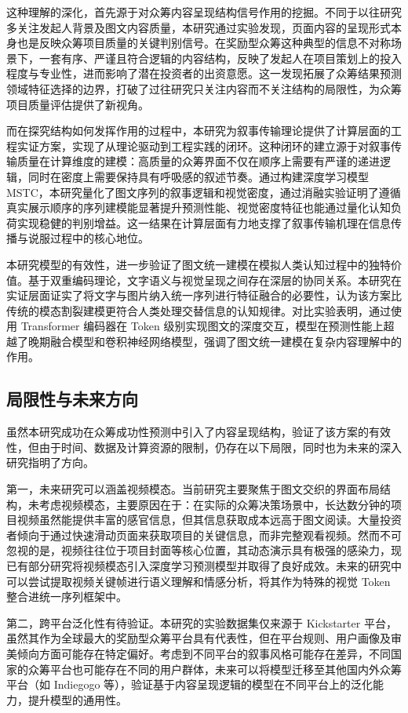 这种理解的深化，首先源于对众筹内容呈现结构信号作用的挖掘。不同于以往研究多关注发起人背景及图文内容质量，本研究通过实验发现，页面内容的呈现形式本身也是反映众筹项目质量的关键判别信号。在奖励型众筹这种典型的信息不对称场景下，一套有序、严谨且符合逻辑的内容结构，反映了发起人在项目策划上的投入程度与专业性，进而影响了潜在投资者的出资意愿。这一发现拓展了众筹结果预测领域特征选择的边界，打破了过往研究只关注内容而不关注结构的局限性，为众筹项目质量评估提供了新视角。

而在探究结构如何发挥作用的过程中，本研究为叙事传输理论提供了计算层面的工程实证方案，实现了从理论驱动到工程实践的闭环。这种闭环的建立源于对叙事传输质量在计算维度的建模：高质量的众筹界面不仅在顺序上需要有严谨的递进逻辑，同时在密度上需要保持具有呼吸感的叙述节奏。通过构建深度学习模型 MSTC，本研究量化了图文序列的叙事逻辑和视觉密度，通过消融实验证明了遵循真实展示顺序的序列建模能显著提升预测性能、视觉密度特征也能通过量化认知负荷实现稳健的判别增益。这一结果在计算层面有力地支撑了叙事传输机理在信息传播与说服过程中的核心地位。

本研究模型的有效性，进一步验证了图文统一建模在模拟人类认知过程中的独特价值。基于双重编码理论，文字语义与视觉呈现之间存在深层的协同关系。本研究在实证层面证实了将文字与图片纳入统一序列进行特征融合的必要性，认为该方案比传统的模态割裂建模更符合人类处理交替信息的认知规律。对比实验表明，通过使用 Transformer 编码器在 Token 级别实现图文的深度交互，模型在预测性能上超越了晚期融合模型和卷积神经网络模型，强调了图文统一建模在复杂内容理解中的作用。

\subsection{局限性与未来方向}
虽然本研究成功在众筹成功性预测中引入了内容呈现结构，验证了该方案的有效性，但由于时间、数据及计算资源的限制，仍存在以下局限，同时也为未来的深入研究指明了方向。

第一，未来研究可以涵盖视频模态。当前研究主要聚焦于图文交织的界面布局结构，未考虑视频模态，主要原因在于：在实际的众筹决策场景中，长达数分钟的项目视频虽然能提供丰富的感官信息，但其信息获取成本远高于图文阅读。大量投资者倾向于通过快速滑动页面来获取项目的关键信息，而非完整观看视频。然而不可忽视的是，视频往往位于项目封面等核心位置，其动态演示具有极强的感染力，现已有部分研究将视频模态引入深度学习预测模型并取得了良好成效。未来的研究中可以尝试提取视频关键帧进行语义理解和情感分析，将其作为特殊的视觉 Token 整合进统一序列框架中。

第二，跨平台泛化性有待验证。本研究的实验数据集仅来源于 Kickstarter 平台，虽然其作为全球最大的奖励型众筹平台具有代表性，但在平台规则、用户画像及审美倾向方面可能存在特定偏好。考虑到不同平台的叙事风格可能存在差异，不同国家的众筹平台也可能存在不同的用户群体，未来可以将模型迁移至其他国内外众筹平台（如 Indiegogo 等），验证基于内容呈现逻辑的模型在不同平台上的泛化能力，提升模型的通用性。

